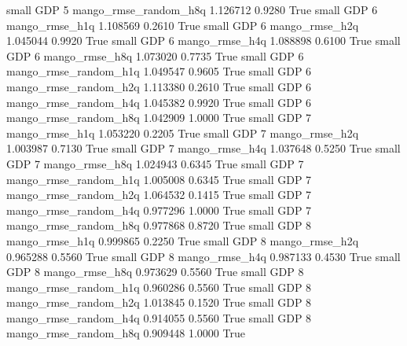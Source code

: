      small      GDP                 5 mango_rmse_random_h8q      1.126712      0.9280    True
     small      GDP                 6        mango_rmse_h1q      1.108569      0.2610    True
     small      GDP                 6        mango_rmse_h2q      1.045044      0.9920    True
     small      GDP                 6        mango_rmse_h4q      1.088898      0.6100    True
     small      GDP                 6        mango_rmse_h8q      1.073020      0.7735    True
     small      GDP                 6 mango_rmse_random_h1q      1.049547      0.9605    True
     small      GDP                 6 mango_rmse_random_h2q      1.113380      0.2610    True
     small      GDP                 6 mango_rmse_random_h4q      1.045382      0.9920    True
     small      GDP                 6 mango_rmse_random_h8q      1.042909      1.0000    True
     small      GDP                 7        mango_rmse_h1q      1.053220      0.2205    True
     small      GDP                 7        mango_rmse_h2q      1.003987      0.7130    True
     small      GDP                 7        mango_rmse_h4q      1.037648      0.5250    True
     small      GDP                 7        mango_rmse_h8q      1.024943      0.6345    True
     small      GDP                 7 mango_rmse_random_h1q      1.005008      0.6345    True
     small      GDP                 7 mango_rmse_random_h2q      1.064532      0.1415    True
     small      GDP                 7 mango_rmse_random_h4q      0.977296      1.0000    True
     small      GDP                 7 mango_rmse_random_h8q      0.977868      0.8720    True
     small      GDP                 8        mango_rmse_h1q      0.999865      0.2250    True
     small      GDP                 8        mango_rmse_h2q      0.965288      0.5560    True
     small      GDP                 8        mango_rmse_h4q      0.987133      0.4530    True
     small      GDP                 8        mango_rmse_h8q      0.973629      0.5560    True
     small      GDP                 8 mango_rmse_random_h1q      0.960286      0.5560    True
     small      GDP                 8 mango_rmse_random_h2q      1.013845      0.1520    True
     small      GDP                 8 mango_rmse_random_h4q      0.914055      0.5560    True
     small      GDP                 8 mango_rmse_random_h8q      0.909448      1.0000    True